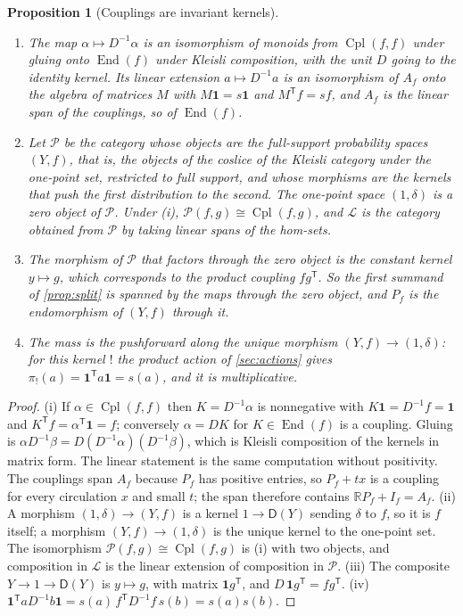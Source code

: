 \documentclass[11pt]{article}
\newtheorem{proposition}[theorem]{Proposition}
\theoremstyle{definition}
\theoremstyle{remark}
\newcommand{\D}{\mathsf{D}}
\newcommand{\R}{\mathbb{R}}
\newcommand{\Cpl}{\operatorname{Cpl}}
\newcommand{\T}{\mathsf T}
\begin{document}
\begin{proposition}[Couplings are invariant kernels]\label{prop:kleisli}
\begin{enumerate}[label=(\roman*)]
\item The map $\alpha\mapsto D^{-1}\alpha$ is an isomorphism of monoids from $\Cpl(f,f)$ under gluing onto $\operatorname{End}(f)$
  under Kleisli composition, with the unit $D$ going to the identity kernel. Its linear extension $a\mapsto D^{-1}a$ is an
  isomorphism of $A_f$ onto the algebra of matrices $M$ with $M\mathbf 1=s\mathbf 1$ and $M^\T f=sf$, and $A_f$ is the linear span of the
  couplings, so of $\operatorname{End}(f)$.
\item Let $\mathcal P$ be the category whose objects are the full-support probability spaces $(Y,f)$, that is, the objects of
  the coslice of the Kleisli category under the one-point set, restricted to full support, and whose morphisms are the
  kernels that push the first distribution to the second. The one-point space $(1,\delta)$ is a zero object of $\mathcal P$.
  Under (i), $\mathcal P(f,g)\cong\Cpl(f,g)$, and $\mathcal L$ is the category obtained from $\mathcal P$ by taking linear spans of the
  hom-sets.
\item The morphism of $\mathcal P$ that factors through the zero object is the constant kernel $y\mapsto g$, which corresponds to the
  product coupling $fg^\T$. So the first summand of \cref{prop:split} is spanned by the maps through the zero object, and
  $P_f$ is the endomorphism of $(Y,f)$ through it.
\item The mass is the pushforward along the unique morphism $(Y,f)\to(1,\delta)$: for this kernel $!$ the product action of
  \cref{sec:actions} gives $\pi_!(a)=\mathbf 1^\T a\mathbf 1=s(a)$, and it is multiplicative.
\end{enumerate}
\end{proposition}
\begin{proof}
(i) If $\alpha\in\Cpl(f,f)$ then $K=D^{-1}\alpha$ is nonnegative with $K\mathbf 1=D^{-1}f=\mathbf 1$ and $K^\T f=\alpha^\T\mathbf 1=f$; conversely
$\alpha=DK$ for $K\in\operatorname{End}(f)$ is a coupling. Gluing is $\alpha D^{-1}\beta=D(D^{-1}\alpha)(D^{-1}\beta)$, which is Kleisli composition of
the kernels in matrix form. The linear statement is the same computation without positivity. The couplings span $A_f$ because
$P_f$ has positive entries, so $P_f+tx$ is a coupling for every circulation $x$ and small $t$; the span therefore contains $\R P_f+I_f=A_f$.
(ii) A morphism $(1,\delta)\to(Y,f)$ is a kernel $1\to\D(Y)$ sending $\delta$ to $f$, so it is $f$ itself; a morphism $(Y,f)\to(1,\delta)$ is
the unique kernel to the one-point set. The isomorphism $\mathcal P(f,g)\cong\Cpl(f,g)$ is (i) with two objects, and composition in
$\mathcal L$ is the linear extension of composition in $\mathcal P$. (iii) The composite $Y\to1\to\D(Y)$ is $y\mapsto g$, with matrix $\mathbf 1g^\T$, and
$D\,\mathbf 1g^\T=fg^\T$. (iv) $\mathbf 1^\T aD^{-1}b\mathbf 1=s(a)\,f^\T D^{-1}f\,s(b)=s(a)s(b)$.
\end{proof}
\end{document}

